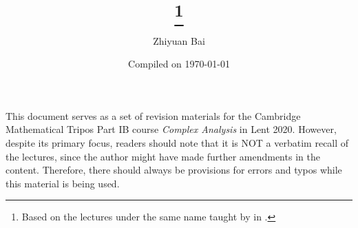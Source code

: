 \documentclass[a4paper]{article}
\title{\triposcourse{}
\thanks{Based on the lectures under the same name taught by \triposlecturer{} in \triposterm{}.}}
\author{Zhiyuan Bai}
\date{Compiled on \today}
\newcommand{\triposcourse}{Complex Analysis}
\newcommand{\triposterm}{Lent 2020}
\newcommand{\tripospart}{IB}
\theoremstyle{plain}
\theoremstyle{definition}
\theoremstyle{remark}
\begin{document}
    \maketitle
    This document serves as a set of revision materials for the Cambridge Mathematical Tripos Part \tripospart{} course \textit{\triposcourse{}} in \triposterm{}.
    However, despite its primary focus, readers should note that it is NOT a verbatim recall of the lectures, since the author might have made further amendments in the content.
    Therefore, there should always be provisions for errors and typos while this material is being used.
    \tableofcontents
    
    
    
    
    
\end{document}
